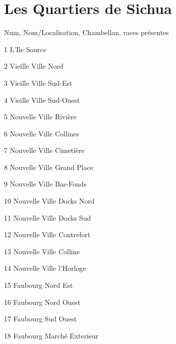 \section{Les Quartiers de Sichua}

Num, Nom/Localisation, Chambellan, races présentes

1 L'Ile Source

2 Vieille Ville Nord

3 Vieille Ville Sud-Est

4 Vieille Ville Sud-Ouest

5 Nouvelle Ville Rivière

6 Nouvelle Ville Collines

7 Nouvelle Ville Cimetière

8 Nouvelle Ville Grand Place

9 Nouvelle Ville Bas-Fonds

10 Nouvelle Ville Docks Nord

11 Nouvelle Ville Docks Sud

12 Nouvelle Ville Contrefort

13 Nouvelle Ville Colline

14 Nouvelle Ville l'Horloge

15 Faubourg Nord Est

16 Faubourg Nord Ouest

17 Faubourg Sud Ouest

18 Faubourg Marché Exterieur
